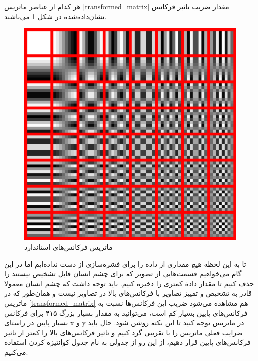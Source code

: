 هر کدام از عناصر ماتریس \ref{transformed_matrix} مقدار ضریب تاثیر فرکانس نشان‌داده‌شده در شکل 
\ref{freq_3} 
می‌باشند. 

\begin{figure}[]
        \centering
        \includegraphics[]{figs/freq_3.png}
        \caption[ماتریس فرکانس‌های استاندارد]{ماتریس فرکانس‌های استاندارد \cite{standard_freqs}}
        \label{freq_3}
\end{figure}

تا به این لحظه هیچ مقداری از داده را برای فشره‌سازی از دست نداده‌ایم اما 
در این گام می‌خواهیم قسمت‌هایی از تصویر که برای چشم انسان قابل تشخیص نیستند
را حذف کنیم تا مقدار دادهٔ کمتری را ذخیره کنیم. 
باید توجه داشت که چشم انسان معمولا قادر به تشخیص و تمییز تصاویر با فرکانس‌های بالا در 
تصاویر نیست و همان‌طور که در ماتریس 
\ref{transformed_matrix}
هم مشاهده می‌شود ضریب این فرکانس‌ها نسبت 
به فرکانس‌های پایین بسیار کم است، می‌توانید به مقدار بسیار بزرگ ۴۱۵ برای
فرکانس بسیار پایین در راستای x و y در ماتریس توجه کنید تا 
این نکته روشن شود. حال باید ضرایب فعلی ماتریس را با تقریبی گرد کنیم و تاثیر 
فرکانس‌های بالا را کمتر از تاثیر فرکانس‌های پایین قرار دهیم، از این رو 
از جدولی به نام
جدول کوانتیزه کردن استفاده می‌کنیم. 

